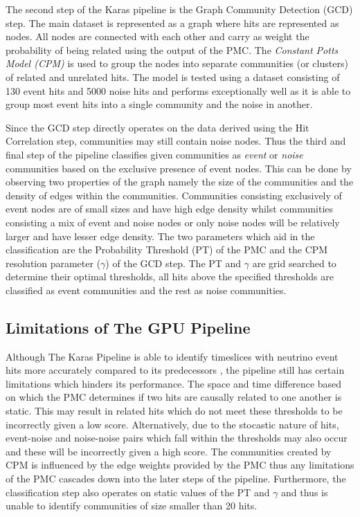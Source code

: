 The second step of the Karas pipeline is the Graph Community Detection
(GCD) step. The main dataset is represented as a graph where hits are
represented as nodes. All nodes are connected with each other and
carry as weight the probability of being related using the output of
the PMC. The \emph{Constant Potts Model (CPM)} \cite{traag2011narrow}
is used to group the nodes into separate communities (or clusters) of
related and unrelated hits. The model is tested using a dataset
consisting of 130 event hits and 5000 noise hits and performs
exceptionally well as it is able to group most event hits into a
single community and the noise in another.

Since the GCD step directly operates on the data derived using the Hit
Correlation step, communities may still contain noise nodes. Thus the
third and final step of the pipeline classifies given communities as
\emph{event} or \emph{noise} communities based on the exclusive
presence of event nodes. This can be done by observing two properties
of the graph namely the size of the communities and the density of
edges within the communities. Communities consisting exclusively of
event nodes are of small sizes and have high edge density whilst
communities consisting a mix of event and noise nodes or only noise
nodes will be relatively larger and have lesser edge density. The two
parameters which aid in the classification are the Probability
Threshold (PT) of the PMC and the CPM resolution parameter ($\gamma$)
of the GCD step. The PT and $\gamma$ are grid searched to determine
their optimal thresholds, all hits above the specified thresholds are
classified as event communities and the rest as noise communities.

\subsection{Limitations of The GPU Pipeline}
Although The Karas Pipeline is able to identify timeslices with
neutrino event hits more accurately compared to its predecessors
\cite{karas2019data}, the pipeline still has certain limitations which
hinders its performance. The space and time difference based on which
the PMC determines if two hits are causally related to one another is
static. This may result in related hits which do not meet these
thresholds to be incorrectly given a low score. Alternatively, due to
the stocastic nature of hits, event-noise and noise-noise pairs which
fall within the thresholds may also occur and these will be
incorrectly given a high score. The communities created by CPM is
influenced by the edge weights provided by the PMC thus any
limitations of the PMC cascades down into the later steps of the
pipeline. Furthermore, the classification step also operates on static
values of the PT and $\gamma$ and thus is unable to identify
communities of size smaller than 20 hits.

